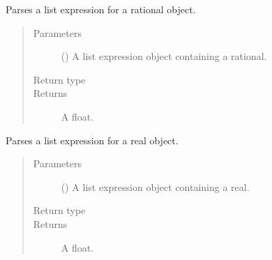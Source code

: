 \documentclass[letterpaper,10pt,english]{sphinxmanual}
\begin{document}

\begin{fulllineitems}
\label{\detokenize{index:secondodb.api.algebras.secondostandardalgebra.parse_rational}}
Parses a list expression for a rational object.
\begin{quote}\begin{description}
\item[{Parameters}] \leavevmode
{} () \textendash{} A list expression object containing a rational.

\item[{Return type}] \leavevmode
{}

\item[{Returns}] \leavevmode
A float.

\end{description}\end{quote}

\end{fulllineitems}


\begin{fulllineitems}
\label{\detokenize{index:secondodb.api.algebras.secondostandardalgebra.parse_real}}
Parses a list expression for a real object.
\begin{quote}\begin{description}
\item[{Parameters}] \leavevmode
{} () \textendash{} A list expression object containing a real.

\item[{Return type}] \leavevmode
{}

\item[{Returns}] \leavevmode
A float.

\end{description}\end{quote}

\end{fulllineitems}
\end{document}
